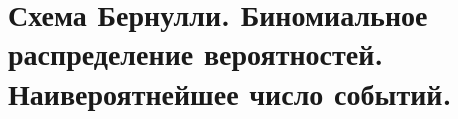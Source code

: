 \documentclass[polytech/stats/exam-2023/stats-exam-2023.tex]{subfiles}
\begin{document}
\section{Схема Бернулли. Биномиальное распределение вероятностей. Наивероятнейшее число событий.}
\end{document}
